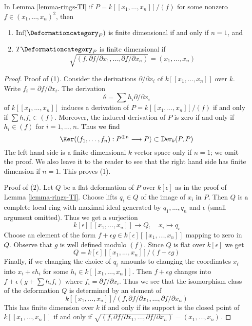 \begin{lemma}
\label{lemma-power-series-rings-TI}
In Lemma \ref{lemma-rings-TI} if $P = k[[x_1, \ldots, x_n]]/(f)$
for some nonzero $f \in (x_1, \ldots, x_n)^2$, then
\begin{enumerate}
\item $\text{Inf}(\Deformationcategory_P)$ is finite dimensional
if and only if $n = 1$, and
\item $T\Deformationcategory_P$ is finite dimensional if
$$
\sqrt{(f, \partial f/\partial x_1, \ldots,  \partial f/\partial x_n)} =
(x_1, \ldots, x_n)
$$
\end{enumerate}
\end{lemma}

\begin{proof}
Proof of (1). Consider the derivations $\partial/\partial x_i$ of
$k[[x_1, \ldots, x_n]]$ over $k$. Write $f_i = \partial f/\partial x_i$.
The derivation
$$
\theta = \sum h_i \partial/\partial x_i
$$
of $k[[x_1, \ldots, x_n]]$
induces a derivation of $P = k[[x_1, \ldots, x_n]]/(f)$
if and only if
$\sum h_i f_i \in (f)$. Moreover, the induced derivation of $P$
is zero if and only if $h_i \in (f)$ for $i = 1, \ldots, n$.
Thus we find
$$
\Ker((f_1, \ldots, f_n) : P^{\oplus n} \longrightarrow P) \subset
\text{Der}_k(P, P)
$$
The left hand side is a finite dimensional $k$-vector space only if
$n = 1$; we omit the proof. We also leave it to the reader to see
that the right hand side has finite dimension if $n = 1$.
This proves (1).

\medskip\noindent
Proof of (2). Let $Q$ be a flat deformation of $P$ over $k[\epsilon]$
as in the proof of Lemma \ref{lemma-rings-TI}. Choose lifts $q_i \in Q$
of the image of $x_i$ in $P$. Then $Q$ is a complete local ring
with maximal ideal generated by $q_1, \ldots, q_n$ and $\epsilon$
(small argument omitted). Thus we get a surjection
$$
k[\epsilon][[x_1, \ldots, x_n]] \longrightarrow Q,\quad
x_i \longmapsto q_i
$$
Choose an element of the form
$f + \epsilon g \in k[\epsilon][[x_1, \ldots, x_n]]$
mapping to zero in $Q$. Observe that $g$ is well defined modulo $(f)$.
Since $Q$ is flat over $k[\epsilon]$ we get
$$
Q = k[\epsilon][[x_1, \ldots, x_n]]/(f + \epsilon g)
$$
Finally, if we changing the choice of $q_i$ amounts to
changing the coordinates $x_i$ into $x_i + \epsilon h_i$
for some $h_i \in k[[x_1, \ldots, x_n]]$. Then
$f + \epsilon g$ changes into $f + \epsilon (g + \sum h_i f_i)$
where $f_i = \partial f/\partial x_i$. Thus we see that the
isomorphism class of the deformation $Q$ is determined
by an element of
$$
k[[x_1, \ldots, x_n]]/
(f, \partial f/\partial x_1, \ldots,  \partial f/\partial x_n)
$$
This has finite dimension over $k$ if and only if
its support is the closed point of $k[[x_1, \ldots, x_n]]$
if and only if
$\sqrt{(f, \partial f/\partial x_1, \ldots,  \partial f/\partial x_n)} =
(x_1, \ldots, x_n)$.
\end{proof}






